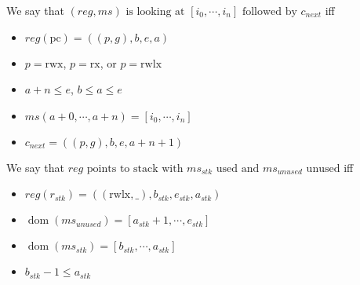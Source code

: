 \documentclass[a4paper]{article}
\DeclareMathOperator{\dom}{dom}
\newcommand{\var}[1]{\mathit{#1}}
\newcommand{\hs}{\var{ms}}
\newcommand{\ms}{\hs}
\newcommand{\pcreg}{\mathrm{pc}}
\newcommand{\reg}{\var{reg}}
\newcommand{\stk}{\var{stk}}
\newcommand{\plainperm}[1]{\mathrm{#1}}
\newcommand{\exec}{\plainperm{rx}}
\newcommand{\rwx}{\plainperm{rwx}}
\newcommand{\rwlx}{\plainperm{rwlx}}
\begin{document}
\begin{lemma}
\begin{definition}
  We say that $(\reg,\ms) \text{ is looking at } [i_0,\cdots,i_n] \text{ followed by } c_{\mathit{next}}$ 
  iff
  \begin{itemize}
  \item $\reg(\pcreg) = ((p,g),b,e,a)$
  \item $p = \rwx$, $p = \exec$, or $p = \rwlx$
  \item $a+n\leq e$, $b\leq a\leq e$
  \item $\ms(a+0,\cdots,a+n) = [i_0,\cdots,i_n]$
  \item $c_{\mathit{next}} = ((p,g),b,e,a+n+1)$
  \end{itemize}
\end{definition}

\begin{definition}
  We say that $\reg \text{ points to stack with $\ms_\stk$ used and $\ms_{\mathit{unused}}$ unused}$
  iff
  \begin{itemize}
  \item $\reg(r_\stk) =((\rwlx,\_),b_\stk,e_\stk,a_\stk)$
  \item $\dom(\ms_{\mathit{unused}}) = [a_\stk+1,\cdots,e_\stk]$
  \item $\dom(\ms_\stk) = [b_\stk,\cdots,a_\stk]$
  \item $b_\stk - 1\leq a_\stk$
  \end{itemize}
\end{definition}


\end{lemma}
\end{document}
